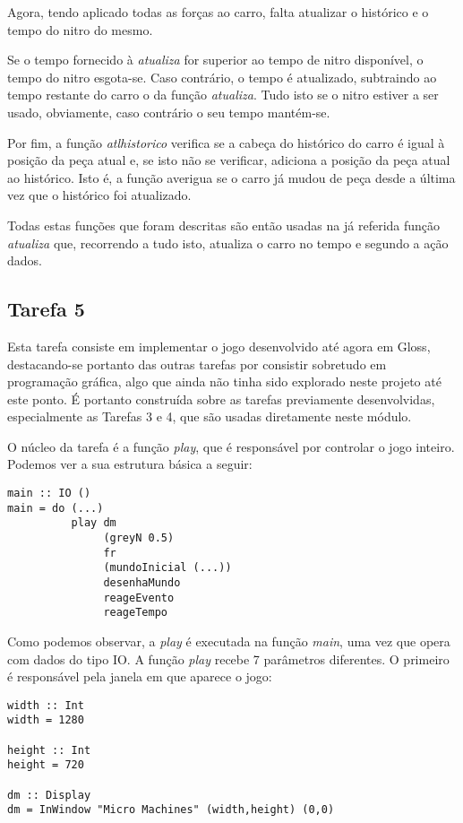 \documentclass[a4paper]{report}
\begin{document}
Agora, tendo aplicado todas as forças ao carro, falta atualizar o histórico e o tempo do nitro do mesmo.

Se o tempo fornecido à \textit{atualiza} for superior ao tempo de nitro disponível, o tempo do nitro esgota-se. Caso contrário, o tempo é atualizado, subtraindo ao tempo restante do carro o da função \textit{atualiza}. Tudo isto se o nitro estiver a ser usado, obviamente, caso contrário o seu tempo mantém-se.

Por fim, a função \textit{atlhistorico} verifica se a cabeça do histórico do carro é igual à posição da peça atual e, se isto não se verificar, adiciona a posição da peça atual ao histórico. Isto é, a função averigua se o carro já mudou de peça desde a última vez que o histórico foi atualizado.

Todas estas funções que foram descritas são então usadas na já referida função \textit{atualiza} que, recorrendo a tudo isto, atualiza o carro no tempo e segundo a ação dados.

\subsection{Tarefa 5}

Esta tarefa consiste em implementar o jogo desenvolvido até agora em Gloss, destacando-se portanto das outras tarefas por consistir sobretudo em programação gráfica, algo que ainda não tinha sido explorado neste projeto até este ponto. É portanto construída sobre as tarefas previamente desenvolvidas, especialmente as Tarefas 3 e 4, que são usadas diretamente neste módulo.

O núcleo da tarefa é a função \textit{play}, que é responsável por controlar o jogo inteiro. Podemos ver a sua estrutura básica a seguir:

\begin{verbatim}
main :: IO ()  
main = do (...)
          play dm               
               (greyN 0.5)      
               fr               
               (mundoInicial (...))
               desenhaMundo     
               reageEvento      
               reageTempo  
\end{verbatim}

Como podemos observar, a \textit{play} é executada na função \textit{main}, uma vez que opera com dados do tipo IO. A função \textit{play} recebe 7 parâmetros diferentes. O primeiro é responsável pela janela em que aparece o jogo:

\begin{verbatim}
width :: Int  
width = 1280

height :: Int 
height = 720

dm :: Display
dm = InWindow "Micro Machines" (width,height) (0,0) 
\end{verbatim}
\end{document}
